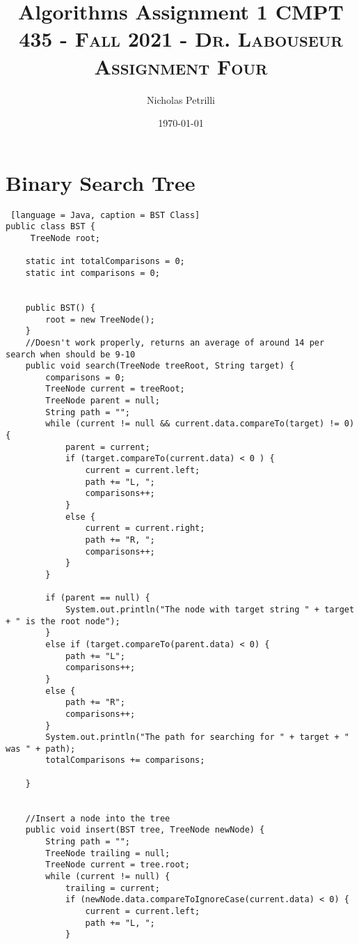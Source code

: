 \documentclass{article}
\title{Algorithms Assignment 1}
\author{Nicholas Petrilli }
\title{	
   \normalfont \normalsize 
   \textsc{CMPT 435 - Fall 2021 - Dr. Labouseur} \\[10pt] %
   \textsc{Assignment Four}
}
\date{\today}
\begin{document}
\lstset{
  numbers=left,
  firstnumber=1,
  numberfirstline=true
}
\maketitle

\section{Binary Search Tree}

\begin{lstlisting} [language = Java, caption = BST Class]
public class BST {
     TreeNode root;

    static int totalComparisons = 0;
    static int comparisons = 0;


    public BST() {
        root = new TreeNode();
    }
    //Doesn't work properly, returns an average of around 14 per search when should be 9-10
    public void search(TreeNode treeRoot, String target) {
        comparisons = 0;
        TreeNode current = treeRoot;
        TreeNode parent = null;
        String path = "";
        while (current != null && current.data.compareTo(target) != 0) {
            parent = current;
            if (target.compareTo(current.data) < 0 ) {
                current = current.left;
                path += "L, ";
                comparisons++;
            }
            else {
                current = current.right;
                path += "R, ";
                comparisons++;
            }
        }
        
        if (parent == null) {
            System.out.println("The node with target string " + target + " is the root node");
        }
        else if (target.compareTo(parent.data) < 0) {
            path += "L";
            comparisons++;
        }
        else {
            path += "R";
            comparisons++;
        }
        System.out.println("The path for searching for " + target + " was " + path);
        totalComparisons += comparisons;

    }
    
    
    //Insert a node into the tree
    public void insert(BST tree, TreeNode newNode) {
        String path = "";
        TreeNode trailing = null;
        TreeNode current = tree.root;
        while (current != null) {
            trailing = current;
            if (newNode.data.compareToIgnoreCase(current.data) < 0) {
                current = current.left;
                path += "L, ";
            }
                

\end{lstlisting}
\end{document}

